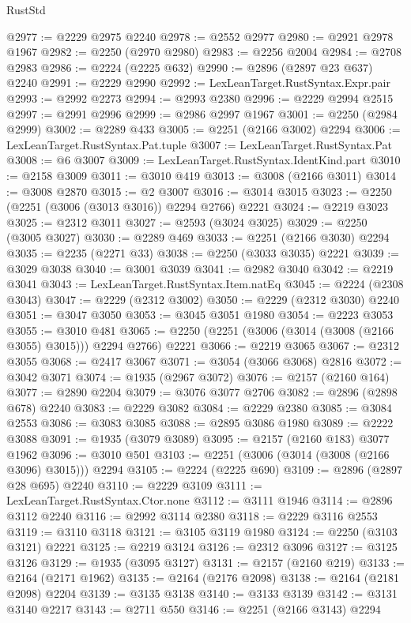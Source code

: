 \begin{lexlean}{RustStd}
\begin{coremodule}
@2977 := @2229 @2975 @2240
@2978 := @2552 @2977
@2980 := @2921 @2978 @1967
@2982 := @2250 (@2970 @2980)
@2983 := @2256 @2004
@2984 := @2708 @2983
@2986 := @2224 (@2225 @632)
@2990 := @2896 (@2897 @23 @637) @2240
@2991 := @2229 @2990
@2992 := LexLeanTarget.RustSyntax.Expr.pair
@2993 := @2992 @2273
@2994 := @2993 @2380
@2996 := @2229 @2994 @2515
@2997 := @2991 @2996
@2999 := @2986 @2997 @1967
@3001 := @2250 (@2984 @2999)
@3002 := @2289 @433
@3005 := @2251 (@2166 @3002) @2294
@3006 := LexLeanTarget.RustSyntax.Pat.tuple
@3007 := LexLeanTarget.RustSyntax.Pat
@3008 := @6 @3007
@3009 := LexLeanTarget.RustSyntax.IdentKind.part
@3010 := @2158 @3009
@3011 := @3010 @419
@3013 := @3008 (@2166 @3011)
@3014 := @3008 @2870
@3015 := @2 @3007
@3016 := @3014 @3015
@3023 := @2250 (@2251 (@3006 (@3013 @3016)) @2294 @2766) @2221
@3024 := @2219 @3023
@3025 := @2312 @3011
@3027 := @2593 (@3024 @3025)
@3029 := @2250 (@3005 @3027)
@3030 := @2289 @469
@3033 := @2251 (@2166 @3030) @2294
@3035 := @2235 (@2271 @33)
@3038 := @2250 (@3033 @3035) @2221
@3039 := @3029 @3038
@3040 := @3001 @3039
@3041 := @2982 @3040
@3042 := @2219 @3041
@3043 := LexLeanTarget.RustSyntax.Item.natEq
@3045 := @2224 (@2308 @3043)
@3047 := @2229 (@2312 @3002)
@3050 := @2229 (@2312 @3030) @2240
@3051 := @3047 @3050
@3053 := @3045 @3051 @1980
@3054 := @2223 @3053
@3055 := @3010 @481
@3065 := @2250 (@2251 (@3006 (@3014 (@3008 (@2166 @3055) @3015))) @2294 @2766) @2221
@3066 := @2219 @3065
@3067 := @2312 @3055
@3068 := @2417 @3067
@3071 := @3054 (@3066 @3068) @2816
@3072 := @3042 @3071
@3074 := @1935 (@2967 @3072)
@3076 := @2157 (@2160 @164)
@3077 := @2890 @2204
@3079 := @3076 @3077 @2706
@3082 := @2896 (@2898 @678) @2240
@3083 := @2229 @3082
@3084 := @2229 @2380
@3085 := @3084 @2553
@3086 := @3083 @3085
@3088 := @2895 @3086 @1980
@3089 := @2222 @3088
@3091 := @1935 (@3079 @3089)
@3095 := @2157 (@2160 @183) @3077 @1962
@3096 := @3010 @501
@3103 := @2251 (@3006 (@3014 (@3008 (@2166 @3096) @3015))) @2294
@3105 := @2224 (@2225 @690)
@3109 := @2896 (@2897 @28 @695) @2240
@3110 := @2229 @3109
@3111 := LexLeanTarget.RustSyntax.Ctor.none
@3112 := @3111 @1946
@3114 := @2896 @3112 @2240
@3116 := @2992 @3114 @2380
@3118 := @2229 @3116 @2553
@3119 := @3110 @3118
@3121 := @3105 @3119 @1980
@3124 := @2250 (@3103 @3121) @2221
@3125 := @2219 @3124
@3126 := @2312 @3096
@3127 := @3125 @3126
@3129 := @1935 (@3095 @3127)
@3131 := @2157 (@2160 @219)
@3133 := @2164 (@2171 @1962)
@3135 := @2164 (@2176 @2098)
@3138 := @2164 (@2181 @2098) @2204
@3139 := @3135 @3138
@3140 := @3133 @3139
@3142 := @3131 @3140 @2217
@3143 := @2711 @550
@3146 := @2251 (@2166 @3143) @2294

\end{coremodule}
\end{lexlean}
